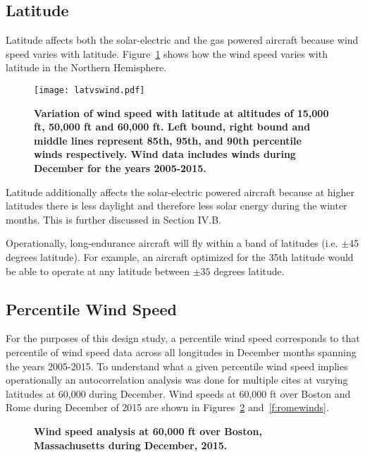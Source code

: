 \documentclass[]{aiaa-tc}%
\begin{document}
\subsection{Latitude}

Latitude affects both the solar-electric and the gas powered aircraft because wind speed varies with latitude. 
Figure~\ref{f:latvswind} shows how the wind speed varies with latitude in the Northern Hemisphere. 

\begin{figure}[H]
	\begin{center}
	\texttt{[image: latvswind.pdf]}
    \caption{\textbf{Variation of wind speed with latitude at altitudes of 15,000 ft, 50,000 ft and 60,000 ft.  Left bound, right bound and middle lines represent 85th, 95th, and 90th percentile winds respectively. Wind data includes winds during December for the years 2005-2015.}}
	\label{f:latvswind}
	\end{center}
\end{figure}

Latitude additionally affects the solar-electric powered aircraft because at higher latitudes there is less daylight and therefore less solar energy during the winter months. This is further discussed in Section IV.B.

Operationally, long-endurance aircraft will fly within a band of latitudes (i.e. $\pm$45 degrees latitude).  
For example, an aircraft optimized for the 35th latitude would be able to operate at any latitude between $\pm35$ degrees latitude. 

\subsection{Percentile Wind Speed}

For the purposes of this design study, a percentile wind speed corresponds to that percentile of wind speed data across all longitudes in December months spanning the years 2005-2015.  
To understand what a given percentile wind speed implies operationally an autocorrelation analysis was done for multiple cites at varying latitudes at 60,000 during December. 
Wind speeds at 60,000 ft over Boston and Rome during December of 2015 are shown in Figures~\ref{f:bostonwinds} and~\ref{f:romewinds}. 

\begin{figure}[H]
 \begin{subfigmatrix}{2}%
 \end{subfigmatrix}
 \caption{\textbf{Wind speed analysis at 60,000 ft over Boston, Massachusetts during December, 2015.}}
 \label{f:bostonwinds}
\end{figure}
\end{document}
